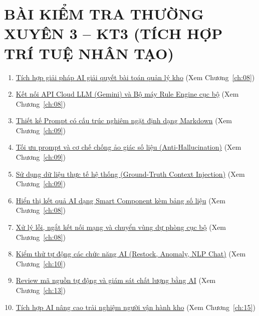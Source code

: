 \documentclass[12pt,a4paper,oneside]{report}
\begin{document}
\section*{\hypertarget{sec:kt3_toc}{BÀI KIỂM TRA THƯỜNG XUYÊN 3 – KT3 (TÍCH HỢP TRÍ TUỆ NHÂN TẠO)}}
\begin{enumerate}
    \item \hyperlink{ch:08}{Tích hợp giải pháp AI giải quyết bài toán quản lý kho} (Xem Chương~\ref{ch:08})
    \item \hyperlink{ch:08}{Kết nối API Cloud LLM (Gemini) và Bộ máy Rule Engine cục bộ} (Xem Chương~\ref{ch:08})
    \item \hyperlink{ch:09}{Thiết kế Prompt có cấu trúc nghiêm ngặt định dạng Markdown} (Xem Chương~\ref{ch:09})
    \item \hyperlink{ch:09}{Tối ưu prompt và cơ chế chống ảo giác số liệu (Anti-Hallucination)} (Xem Chương~\ref{ch:09})
    \item \hyperlink{ch:09}{Sử dụng dữ liệu thực tế hệ thống (Ground-Truth Context Injection)} (Xem Chương~\ref{ch:09})
    \item \hyperlink{ch:08}{Hiển thị kết quả AI dạng Smart Component kèm bảng số liệu} (Xem Chương~\ref{ch:08})
    \item \hyperlink{ch:08}{Xử lý lỗi, ngắt kết nối mạng và chuyển vùng dự phòng cục bộ} (Xem Chương~\ref{ch:08})
    \item \hyperlink{ch:10}{Kiểm thử tự động các chức năng AI (Restock, Anomaly, NLP Chat)} (Xem Chương~\ref{ch:10})
    \item \hyperlink{ch:13}{Review mã nguồn tự động và giám sát chất lượng bằng AI} (Xem Chương~\ref{ch:13})
    \item \hyperlink{ch:15}{Tích hợp AI nâng cao trải nghiệm người vận hành kho} (Xem Chương~\ref{ch:15})
\end{enumerate}
\end{document}
